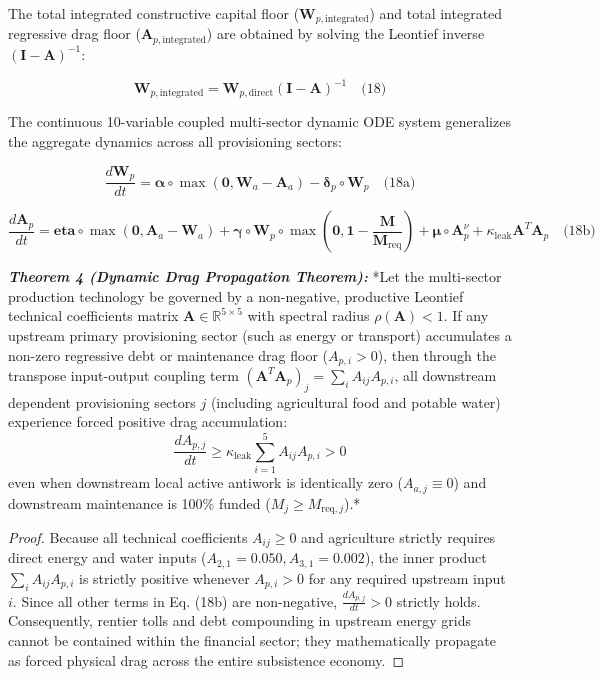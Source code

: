 \documentclass[preprint,12pt,authoryear]{elsarticle}
\theoremstyle{definition}
\begin{document}
The total integrated constructive capital floor ($\mathbf{W}_{p, \text{integrated}}$) and total integrated regressive drag floor ($\mathbf{A}_{p, \text{integrated}}$) are obtained by solving the Leontief inverse $(\mathbf{I} - \mathbf{A})^{-1}$:

$$\mathbf{W}_{p, \text{integrated}} = \mathbf{W}_{p, \text{direct}} (\mathbf{I} - \mathbf{A})^{-1} \quad \text{(18)}$$

The continuous 10-variable coupled multi-sector dynamic ODE system generalizes the aggregate dynamics across all provisioning sectors:

$$ \frac{d\mathbf{W}_p}{dt} = \mathbf{ \alpha} \circ \max(\mathbf{0}, \mathbf{W}_a - \mathbf{A}_a) - \mathbf{\delta}_p \circ \mathbf{W}_p \quad \text{(18a)}$$

$$ \frac{d\mathbf{A}_p}{dt} = \mathbf{ eta} \circ \max(\mathbf{0}, \mathbf{A}_a - \mathbf{W}_a) + \mathbf{\gamma} \circ \mathbf{W}_p \circ \max\left(\mathbf{0}, \mathbf{1} -  \frac{\mathbf{M}}{\mathbf{M}_{ \text{req}}} \right) + \mathbf{\mu} \circ \mathbf{A}_p^\nu + \kappa_{ \text{leak}} \mathbf{A}^T \mathbf{A}_p \quad \text{(18b)}$$

\textbf{\textit{Theorem 4 (Dynamic Drag Propagation Theorem):}} *Let the multi-sector production technology be governed by a non-negative, productive Leontief technical coefficients matrix $\mathbf{A} \in \mathbb{R}^{5 \times 5}$ with spectral radius $\rho(\mathbf{A}) < 1$. If any upstream primary provisioning sector (such as energy or transport) accumulates a non-zero regressive debt or maintenance drag floor ($A_{p,i} > 0$), then through the transpose input-output coupling term $(\mathbf{A}^T \mathbf{A}_p)_j = \sum_i A_{ij} A_{p,i}$, all downstream dependent provisioning sectors $j$ (including agricultural food and potable water) experience forced positive drag accumulation: $$ \frac{dA_{p,j}}{dt} \ge \kappa_{ \text{leak}} \sum_{i=1}^5 A_{ij} A_{p,i} > 0$$ even when downstream local active antiwork is identically zero ($A_{a,j} \equiv 0$) and downstream maintenance is 100\% funded ($M_j \ge M_{ \text{req}, j}$).*

\begin{proof} Because all technical coefficients $A_{ij} \ge 0$ and agriculture strictly requires direct energy and water inputs ($A_{2,1} = 0.050, A_{3,1} = 0.002$), the inner product $\sum_i A_{ij} A_{p,i}$ is strictly positive whenever $A_{p,i} > 0$ for any required upstream input $i$. Since all other terms in Eq. (18b) are non-negative, $ \frac{dA_{p,j}}{dt} > 0$ strictly holds. Consequently, rentier tolls and debt compounding in upstream energy grids cannot be contained within the financial sector; they mathematically propagate as forced physical drag across the entire subsistence economy. \end{proof}
\end{document}
